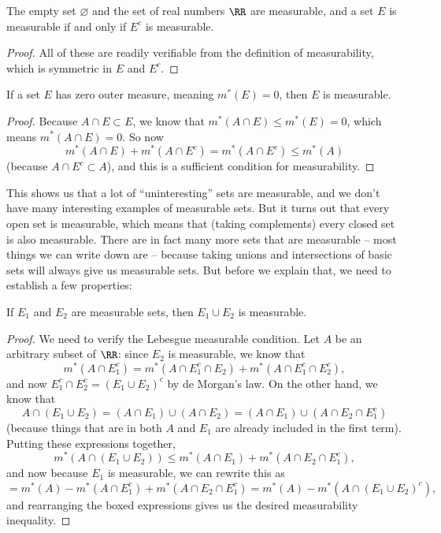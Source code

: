 \begin{lemma}
The empty set $\varnothing$ and the set of real numbers $\RR$ are measurable, and a set $E$ is measurable if and only if $E^c$ is measurable.
\end{lemma}
\begin{proof}
All of these are readily verifiable from the definition of measurability, which is symmetric in $E$ and $E^c$. 
\end{proof}

\begin{proposition}
If a set $E$ has zero outer measure, meaning $m^\ast(E) = 0$, then $E$ is measurable.
\end{proposition}
\begin{proof}
Because $A \cap E \subset E$, we know that $m^\ast(A \cap E) \le m^\ast(E) = 0$, which means $m^\ast(A \cap E) = 0$. So now 
\[
    m^\ast(A \cap E) + m^\ast(A \cap E^c) = m^\ast(A \cap E^c) \le m^\ast(A)
\]
(because $A \cap E^c \subset A$), and this is a sufficient condition for measurability.
\end{proof} 

This shows us that a lot of ``uninteresting'' sets are measurable, and we don't have many interesting examples of measurable sets. But it turns out that every open set is measurable, which means that (taking complements) every closed set is also measurable. There are in fact many more sets that are measurable -- most things we can write down are -- because taking unions and intersections of basic sets will always give us measurable sets. But before we explain that, we need to establish a few properties:

\begin{proposition}
If $E_1$ and $E_2$ are measurable sets, then $E_1 \cup E_2$ is measurable.
\end{proposition}
\begin{proof}
We need to verify the Lebesgue measurable condition. Let $A$ be an arbitrary subset of $\RR$: since $E_2$ is measurable, we know that 
\[
    m^\ast(A \cap E_1^c) = m^\ast(A \cap E_1^c \cap E_2) + m^\ast(A \cap E_1^c \cap E_2^c),
\]  
and now $E_1^c \cap E_2^c = (E_1 \cup E_2)^c$ by de Morgan's law. On the other hand, we know that 
\[
    A \cap (E_1 \cup E_2) = (A \cap E_1) \cup (A \cap E_2) = (A \cap E_1) \cup (A \cap E_2 \cap E_1^c)
\]
(because things that are in both $A$ and $E_1$ are already included in the first term). Putting these expressions together, 
\[
    \boxed{m^\ast(A \cap (E_1 \cup E_2))} \le m^\ast(A \cap E_1) + m^\ast(A \cap E_2 \cap E_1^c),
\]
and now because $E_1$ is measurable, we can rewrite this as 
\[
    = m^\ast(A) - m^\ast(A \cap E_1^c) + m^\ast(A \cap E_2 \cap E_1^c) = \boxed{m^\ast(A) - m^\ast(A \cap (E_1 \cup E_2)^c)},
\]
and rearranging the boxed expressions gives us the desired measurability inequality.
\end{proof}

